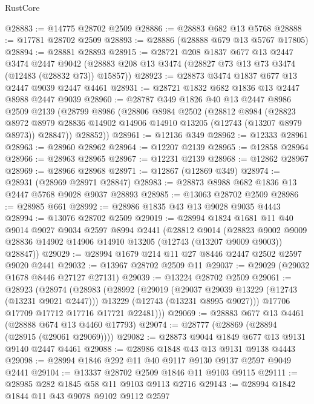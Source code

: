 \begin{lexlean}{RustCore}
\begin{coremodule}
@28883 := @14775 @28702 @2509
@28886 := @28883 @682 @13 @5768
@28888 := @17781 @28702 @2509
@28893 := @28886 (@28888 @679 @13 @5767 @17805)
@28894 := @28881 @28893
@28915 := @28721
    @208
    @1837
    @677
    @13
    @2447
    @3474
    @2447
    @9042
    (@28883 @208 @13 @3474 (@28827 @73 @13 @73 @3474 (@12483 (@28832 @73)) @15857))
@28923 := @28873 @3474 @1837 @677 @13 @2447 @9039 @2447 @4461
@28931 := @28721 @1832 @682 @1836 @13 @2447 @8988 @2447 @9039
@28960 := @28787
    @349
    @1826
    @40
    @13
    @2447
    @8986
    @2509
    @2139
    (@28799
      @8986
      (@28806
        @8984
        @2502
        (@28812
          @8984
          (@28823
            @8972
            @8979
            @28836
            @14902
            @14906
            @14910
            @13205
            (@12743 (@13207 @8979 @8973))
            @28847))
        @28852))
@28961 := @12136 @349
@28962 := @12333 @28961
@28963 := @28960 @28962
@28964 := @12207 @2139
@28965 := @12858 @28964
@28966 := @28963 @28965
@28967 := @12231 @2139
@28968 := @12862 @28967
@28969 := @28966 @28968
@28971 := @12867 (@12869 @349)
@28974 := @28931 (@28969 @28971 @28847)
@28983 := @28873 @8988 @682 @1836 @13 @2447 @5768 @9028 @9037 @28893
@28985 := @13063 @28702 @2509
@28986 := @28985 @661
@28992 := @28986 @1835 @43 @13 @9028 @9035 @4443
@28994 := @13076 @28702 @2509
@29019 := @28994
    @1824
    @1681
    @11
    @40
    @9014
    @9027
    @9034
    @2597
    @8994
    @2441
    (@28812
      @9014
      (@28823 @9002 @9009 @28836 @14902 @14906 @14910 @13205 (@12743 (@13207 @9009 @9003)) @28847))
@29029 := @28994 @1679 @214 @11 @27 @8446 @2447 @2502 @2597 @9020 @2441
@29032 := @13967 @28702 @2509 @11
@29037 := @29029 (@29032 @1678 @8446 @27127 @27131)
@29039 := @13224 @28702 @2509
@29061 := @28923
    (@28974
      (@28983
        (@28992
          (@29019
            (@29037 @29039 @13229 (@12743 (@13231 @9021 @2447)))
            @13229
            (@12743 (@13231 @8995 @9027)))
          @17706
          @17709
          @17712
          @17716
          @17721
          @22481)))
@29069 := @28883 @677 @13 @4461 (@28888 @674 @13 @4460 @17793)
@29074 := @28777 (@28869 (@28894 (@28915 (@29061 @29069))))
@29082 := @28873 @9044 @1849 @677 @13 @9131 @9140 @2447 @4461
@29088 := @28986 @1848 @43 @13 @9131 @9138 @4443
@29098 := @28994 @1846 @292 @11 @40 @9117 @9130 @9137 @2597 @9049 @2441
@29104 := @13337 @28702 @2509 @1846 @11 @9103 @9115
@29111 := @28985 @282 @1845 @58 @11 @9103 @9113 @2716
@29143 := @28994
    @1842
    @1844
    @11
    @43
    @9078
    @9102
    @9112
    @2597

\end{coremodule}
\end{lexlean}
